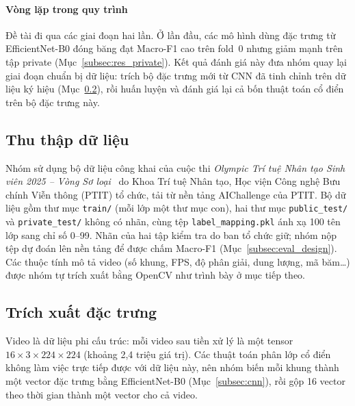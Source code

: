 \paragraph*{Vòng lặp trong quy trình} Đề tài đi qua các giai đoạn hai lần. Ở lần đầu, các mô hình dùng đặc trưng từ EfficientNet-B0 đóng băng đạt Macro-F1 cao trên fold~0 nhưng giảm mạnh trên tập private (Mục~\ref{subsec:res_private}). Kết quả đánh giá này đưa nhóm quay lại giai đoạn chuẩn bị dữ liệu: trích bộ đặc trưng mới từ CNN đã tinh chỉnh trên dữ liệu ký hiệu (Mục~\ref{subsec:features}), rồi huấn luyện và đánh giá lại cả bốn thuật toán cổ điển trên bộ đặc trưng này.

\subsection{Thu thập dữ liệu}
\label{subsec:data_source}

Nhóm sử dụng bộ dữ liệu công khai của cuộc thi \textit{Olympic Trí tuệ Nhân tạo Sinh viên 2025 -- Vòng Sơ loại}~\cite{ptit2025} do Khoa Trí tuệ Nhân tạo, Học viện Công nghệ Bưu chính Viễn thông (PTIT) tổ chức, tải từ nền tảng AIChallenge của PTIT. Bộ dữ liệu gồm thư mục \texttt{train/} (mỗi lớp một thư mục con), hai thư mục \texttt{public\_test/} và \texttt{private\_test/} không có nhãn, cùng tệp \texttt{label\_mapping.pkl} ánh xạ 100 tên lớp sang chỉ số 0--99. Nhãn của hai tập kiểm tra do ban tổ chức giữ; nhóm nộp tệp dự đoán lên nền tảng để được chấm Macro-F1 (Mục~\ref{subsec:eval_design}). Các thuộc tính mô tả video (số khung, FPS, độ phân giải, dung lượng, mã băm\ldots) được nhóm tự trích xuất bằng OpenCV như trình bày ở mục tiếp theo.





\subsection{Trích xuất đặc trưng}
\label{subsec:features}

Video là dữ liệu phi cấu trúc: mỗi video sau tiền xử lý là một tensor $16\times3\times224\times224$ (khoảng 2,4 triệu giá trị). Các thuật toán phân lớp cổ điển không làm việc trực tiếp được với dữ liệu này, nên nhóm biến mỗi khung thành một vector đặc trưng bằng EfficientNet-B0 (Mục~\ref{subsec:cnn}), rồi gộp 16 vector theo thời gian thành một vector cho cả video.

